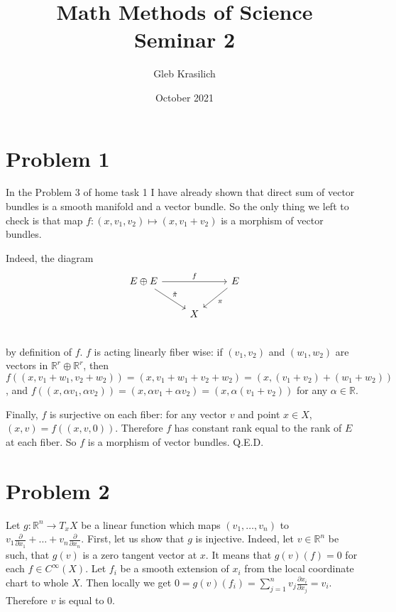 \documentclass{article}[14pt]
\title{Math Methods of Science \\
Seminar 2}
\author{Gleb Krasilich}
\date{October 2021}
\begin{document}
\maketitle

\section{Problem 1}

In the Problem 3 of home task 1 I have already shown that direct sum of vector bundles is a smooth manifold and a vector bundle.
So the only thing we left to check is that map $f: (x, v_1, v_2) \mapsto (x, v_1 + v_2)$ is a morphism of vector bundles.\

Indeed, the diagram
\[
\begin{tikzcd}
    E \oplus E \arrow[rr, "f"] \arrow[rd, "\tilde{\pi}"] & &  \arrow[ld, "\pi"] E \\
    & X & \\
\end{tikzcd}
\]
by definition of $f$.
$f$ is acting linearly fiber wise: if $(v_1, v_2)$ and $(w_1, w_2)$ are vectors in 
$\mathbb R^r \oplus \mathbb R^r$, then $f((x, v_1 + w_1, v_2 + w_2)) = (x, v_1 + w_1 + v_2 + w_2) = (x, (v_1 + v_2) + (w_1 + w_2))$,
and $f((x, \alpha v_1, \alpha v_2)) = (x, \alpha v_1 + \alpha v_2) = (x, \alpha (v_1 + v_2))$ for any $\alpha \in \mathbb R$.

Finally, $f$ is surjective on each fiber: for any vector $v$ and point $x \in X$, $(x, v) = f((x, v, 0))$.
Therefore $f$ has constant rank equal to the rank of $E$ at each fiber.
So $f$ is a morphism of vector bundles. Q.E.D.

\section{Problem 2}

Let $g: \mathbb R^n \rightarrow T_x X$ be a linear function which maps $(v_1, \dots, v_n)$ to $v_1 \frac{\partial}{\partial x_1} + \dots + v_n \frac{\partial}{\partial x_n}$.
First, let us show that $g$ is injective. 
Indeed, let $v \in \mathbb R^n$ be such, that $g(v)$ is a zero tangent vector at $x$.
It means that $g(v)(f) = 0$ for each $f \in C^\infty(X)$.
Let $f_i$ be a smooth extension of $x_i$ from the local coordinate chart to whole $X$.
Then locally we get $0 = g(v)(f_i) = \sum_{j=1}^n v_j \frac{\partial x_i}{\partial x_j} = v_i$.
Therefore $v$ is equal to $0$.
\end{document}
